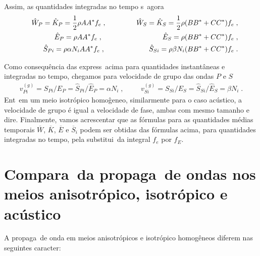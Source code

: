 Assim, as quantidades integradas no tempo s\ao\
agora
\begin{eqnarray}
& &\hat{W}_P=\hat{K}_P=\frac{1}{2}\rho AA^{*}f_e \; ,
\hspace{1.5cm}
\hat{W}_S=\hat{K}_S=\frac{1}{2}\rho (BB^{*} +
CC^{*})f_e\; , \\
& &\hat{E}_P=\rho AA^{*}f_e \; ,
\hspace{3.0cm}
\hat{E}_S=\rho (BB^{*} + CC^{*})f_e \; , \\
& &\hat{S}_{Pi}=\rho\alpha N_i AA^{*}f_e \; ,
\hspace{2.2cm}
\hat{S}_{Si}=\rho\beta N_i (BB^{*} + CC^{*})f_e \; . 
\end{eqnarray}

Como consequ\^encia das express\oes\ acima para 
quantidades instant\^aneas e integradas no tempo,
chegamos para velocidade de grupo das ondas $P$ e
$S$
\begin{eqnarray}
v_{Pi}^{(g)} = S_{Pi}/E_P = \hat{S}_{Pi}/\hat{E}_P
= \alpha N_i \; , \hspace{1cm} v_{Si}^{(g)} =
S_{Si}/E_S = \hat{S}_{Si}/\hat{E}_S = \beta N_i \; .
\end{eqnarray}
Ent\ao\ em um meio isotr\'opico homo\^geneo,
similarmente para o caso ac\'ustico, a velocidade
de grupo \'e igual a velocidade de fase, ambas
com mesmo tamanho e dire\cao. Finalmente, vamos
acrescentar que as f\'ormulas para as quantidades
m\'edias temporais $\overline{W}$, $\overline{K}$,
$\overline{E}$ e $\overline{S}_i$ podem ser
obtidas das f\'ormulas acima, para quantidades
integradas no tempo, pela substitui\cao\ da
integral $f_e$ por $f_E$.


\section[Compara\cao\ dos meios anisotr\'opico, isotr\'opico e
ac\'ustico]{Compara\cao\ da propaga\cao\ de ondas
nos meios anisotr\'opico, isotr\'opico e ac\'ustico}

A propaga\cao\ de onda em meios anisotr\'opicos e
isotr\'opico homog\^eneos diferem nas seguintes
caracter\isticas:

